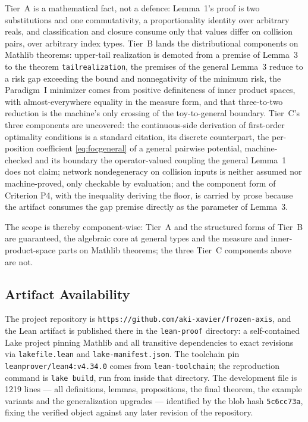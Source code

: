Tier~A is a mathematical fact, not a defence: Lemma~1's proof is two substitutions and one commutativity, a proportionality identity over arbitrary reals, and classification and closure consume only that values differ on collision pairs, over arbitrary index types. Tier~B lands the distributional components on Mathlib theorems: upper-tail realization is demoted from a premise of Lemma~3 to the theorem \texttt{tail\ttu realization}, the premises of the general Lemma~3 reduce to a risk gap exceeding the bound and nonnegativity of the minimum risk, the Paradigm~I minimizer comes from positive definiteness of inner product spaces, with almost-everywhere equality in the measure form, and that three-to-two reduction is the machine's only crossing of the toy-to-general boundary. Tier~C's three components are uncovered: the continuous-side derivation of first-order optimality conditions is a standard citation, its discrete counterpart, the per-position coefficient \eqref{eq:focgeneral} of a general pairwise potential, machine-checked and its boundary the operator-valued coupling the general Lemma~1 does not claim; network nondegeneracy on collision inputs is neither assumed nor machine-proved, only checkable by evaluation; and the component form of Criterion P4, with the inequality deriving the floor, is carried by prose because the artifact consumes the gap premise directly as the parameter of Lemma~3.

The scope is thereby component-wise: Tier~A and the structured forms of Tier~B are guaranteed, the algebraic core at general types and the measure and inner-product-space parts on Mathlib theorems; the three Tier~C components above are not.

\subsection{Artifact Availability}

The project repository is \texttt{https://github.com/\hspace{0pt}aki-xavier/\hspace{0pt}frozen-axis}, and the Lean artifact is published there in the \texttt{lean-proof} directory: a self-contained Lake project pinning Mathlib and all transitive dependencies to exact revisions via \texttt{lakefile.lean} and \texttt{lake-manifest.json}. The toolchain pin \texttt{leanprover/\hspace{0pt}lean4:v4.34.0} comes from \texttt{lean-toolchain}; the reproduction command is \texttt{lake build}, run from inside that directory. The development file is 1219 lines --- all definitions, lemmas, propositions, the final theorem, the example variants and the generalization upgrades --- identified by the blob hash \texttt{5c6cc73a}, fixing the verified object against any later revision of the repository.

